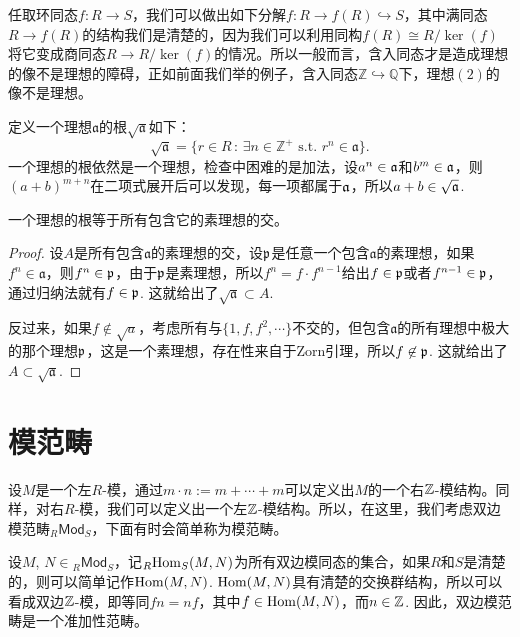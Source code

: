 任取环同态$f:R\to S$，我们可以做出如下分解$f:R\to f(R)\hookrightarrow S$，其中满同态$R\to f(R)$的结构我们是清楚的，因为我们可以利用同构$f(R)\cong R/\ker(f)$将它变成商同态$R\to R/\ker(f)$的情况。所以一般而言，含入同态才是造成理想的像不是理想的障碍，正如前面我们举的例子，含入同态$\mathbb{Z}\hookrightarrow \mathbb{Q}$下，理想$(2)$的像不是理想。

\begin{para}[理想的根]
定义一个理想$\mathfrak{a}$的根$\sqrt{\mathfrak{a}}$如下：
\[
	\sqrt{\mathfrak{a}}=\{r\in R\,:\,\exists n\in \mathbb{Z}^+\text{ s.t. }r^n\in \mathfrak{a}\}.
\]
一个理想的根依然是一个理想，检查中困难的是加法，设$a^n\in \mathfrak{a}$和$b^m\in \mathfrak{a}$，则$(a+b)^{m+n}$在二项式展开后可以发现，每一项都属于$\mathfrak{a}$，所以$a+b\in \sqrt{\mathfrak{a}}$.
\end{para}

\begin{pro}
一个理想的根等于所有包含它的素理想的交。
\end{pro}

\begin{proof}
设$A$是所有包含$\mathfrak{a}$的素理想的交，设$\mathfrak{p}$是任意一个包含$\mathfrak{a}$的素理想，如果$f^n\in \mathfrak{a}$，则$f^n\in \mathfrak{p}$，由于$\mathfrak{p}$是素理想，所以$f^n=f\cdot f^{n-1}$给出$f\in\mathfrak{p}$或者$f^{n-1}\in\mathfrak{p}$，通过归纳法就有$f\in \mathfrak{p}$. 这就给出了$\sqrt{\mathfrak{a}}\subset A$. 

反过来，如果$f\not\in \sqrt{a}$，考虑所有与$\{1,f,f^2,\cdots\}$不交的，但包含$\mathfrak{a}$的所有理想中极大的那个理想$\mathfrak{p}$，这是一个素理想，存在性来自于Zorn引理，所以$f\not\in \mathfrak{p}$. 这就给出了$A\subset \sqrt{\mathfrak{a}}$.
\end{proof}


\section{模范畴}

设$M$是一个左$R$-模，通过$m\cdot n:=m+\cdots+m$可以定义出$M$的一个右$\mathbb{Z}$-模结构。同样，对右$R$-模，我们可以定义出一个左$\mathbb{Z}$-模结构。所以，在这里，我们考虑双边模范畴${}_R\mathsf{Mod}_S$，下面有时会简单称为模范畴。

设$M$, $N\in {}_R\mathsf{Mod}_S$，记${}_R\!\operatorname{Hom}_S(M,N)$为所有双边模同态的集合，如果$R$和$S$是清楚的，则可以简单记作$\operatorname{Hom}(M,N)$. $\operatorname{Hom}(M,N)$具有清楚的交换群结构，所以可以看成双边$\mathbb{Z}$-模，即等同$fn=nf$，其中$f\in \operatorname{Hom}(M,N)$，而$n\in \mathbb{Z}$. 因此，双边模范畴是一个准加性范畴。

